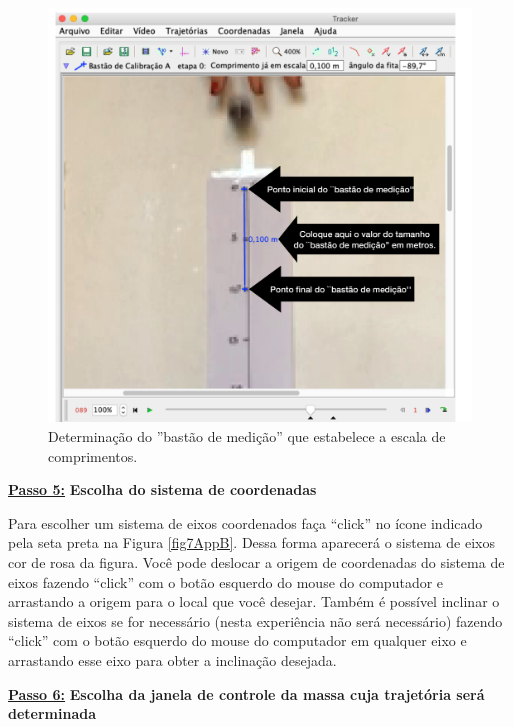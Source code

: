 \begin{minipage}{\linewidth}
\begin{minipage}{0.38\linewidth}
\begin{figure}[H]
              \includegraphics[width=\linewidth]{Figuras_exp3/fig6AppB.pdf}
\caption{\label{fig6AppB} Determinação do ''bastão de medição'' que estabelece a escala de comprimentos.}
          \end{figure}
      \end{minipage}
  \end{minipage}%


\underline{\bf Passo 5:} {\bf Escolha do sistema de coordenadas}\\
\vskip -0.5cm

Para escolher um sistema de eixos coordenados faça ``click'' no ícone indicado pela seta preta na Figura \ref{fig7AppB}. Dessa forma aparecerá o sistema de eixos cor de rosa da figura. Você pode deslocar 
a origem de coordenadas do sistema de eixos fazendo ``click'' com o botão esquerdo do mouse do computador e arrastando a origem para o local que você desejar. Também é possível inclinar o sistema de eixos se for necessário (nesta experiência não será necessário) fazendo ``click'' com o botão esquerdo do mouse do computador em qualquer eixo e arrastando esse eixo para obter a inclinação desejada.

\underline{\bf Passo 6:} {\bf Escolha da janela de controle da massa cuja trajetória
será determinada}\\
\vskip -0.5cm

